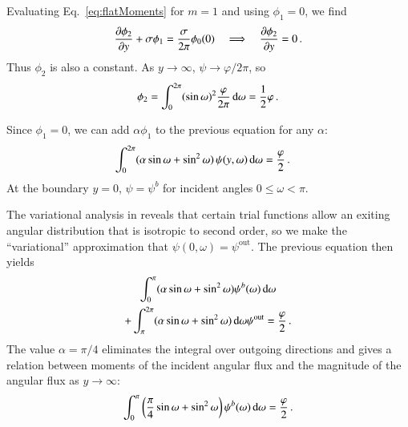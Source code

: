 \documentclass{anstrans}
\begin{document}
Evaluating Eq.~\eqref{eq:flatMoments} for $m=1$ and using
$\phi_{1}=0$, we find
\begin{equation*}
  \frac{\partial \phi_{2}}{\partial y}
  + \sigma \phi_{1}
  = \frac{\sigma}{2\pi} \phi_{0} (0)
  \quad \Longrightarrow \quad
  \frac{\partial \phi_{2}}{\partial y} = 0\,.
\end{equation*}
Thus $\phi_{2}$ is also a constant. As $y\to\infty$, $\psi\to\varphi/2\pi$, so
\begin{equation*}
  \phi_{2} = \int_{0}^{2\pi} (\sin\omega)^2 \frac{\varphi}{2\pi} \mathop{}\!\mathrm{d}\omega
  = \frac{1}{2} \varphi\,.
\end{equation*}

Since $\phi_1=0$, we can add $\alpha \phi_1$ to the previous equation for any
$\alpha$:
\begin{align*}
 \int_{0}^{2\pi} (\alpha \sin\omega + \sin^2\omega)\,
 \psi(y,\omega) \mathop{}\!\mathrm{d}\omega
 &= \frac{\varphi}{2}\,.
\end{align*}
At the boundary $y=0$, $\psi=\psi^b$ for incident angles $0 \le \omega < \pi$.

The variational analysis in \cite{Mal1991} reveals that certain trial functions
allow an exiting angular distribution that is isotropic to second order, so
we make the ``variational'' approximation that $\psi(0,\omega)=\psi^\text{out}$.
The previous equation then yields
\begin{multline*}
 \int_{0}^{\pi} (\alpha \sin\omega + \sin^2\omega)
 \psi^b(\omega) \mathop{}\!\mathrm{d}\omega
\\ + \int_{\pi}^{2\pi} (\alpha \sin\omega + \sin^2\omega)\mathop{}\!\mathrm{d}\omega \psi^\text{out}
 = \frac{\varphi}{2}\,.
\end{multline*}
The value $\alpha=\pi/4$ eliminates the integral over outgoing directions and
gives a relation between moments of the incident angular flux and the
magnitude of the angular flux as $y\to\infty$:
\begin{equation}\label{eq:varBoundary}
  \int_{0}^{\pi} \left( \frac{\pi}{4} \sin\omega + \sin^2\omega \right)
 \psi^b(\omega) \mathop{}\!\mathrm{d}\omega
 = \frac{\varphi}{2}\,.
\end{equation}
\end{document}
